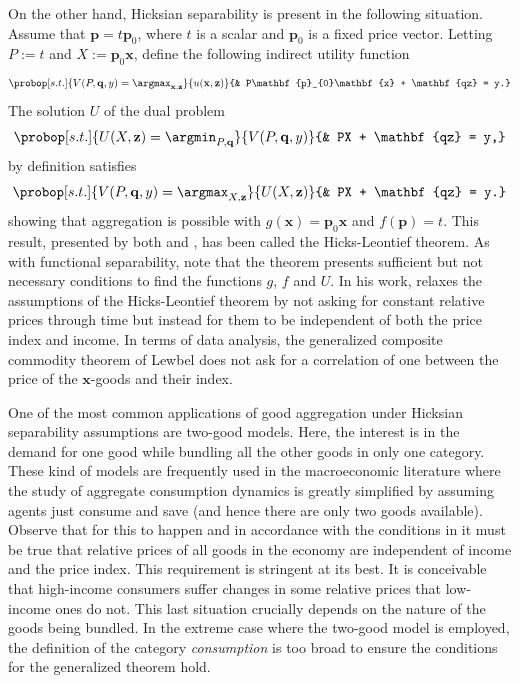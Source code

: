 \documentclass[english, a4paper, 12pt]{article}
\begin{document}
On the other hand, Hicksian separability is present in the following situation. Assume that $\mathbf{p} = t\mathbf{p}_{0}$, where $t$ is a scalar and $\mathbf{p}_{0}$ is a fixed price vector. Letting $P := t$ and $X := \mathbf{p}_{0}\mathbf{x}$, define the following indirect utility function
	$$	\probop[s.t.]{V(P, \mathbf{q}, y) = \argmax_{\mathbf{x}, \mathbf{z}}}{u(\mathbf{x}, \mathbf{z})}
				{&	P\mathbf{p}_{0}\mathbf{x} + \mathbf{qz} = y.}
	$$
The solution $U$ of the dual problem
	$$	\probop[s.t.]{U(X, \mathbf{z}) = \argmin_{P, \mathbf{q}}}{V(P, \mathbf{q},y)}
				{&	PX + \mathbf{qz} = y,}
	$$
by definition satisfies
	$$	\probop[s.t.]{V(P, \mathbf{q}, y) = \argmax_{X, \mathbf{z}}}{U(X, \mathbf{z})}
				{&	PX + \mathbf{qz} = y.}
	$$
showing that aggregation is possible with $g(\mathbf{x}) = \mathbf{p}_{0}\mathbf{x}$ and $f(\mathbf{p}) = t$. This result, presented by both \cite{Leontief36} and \cite{HicksBook}, has been called the Hicks-Leontief theorem. As with functional separability, note that the theorem presents sufficient but not necessary conditions to find the functions $g$, $f$ and $U$. In his work, \cite{Lewbel96} relaxes the assumptions of the Hicks-Leontief theorem by not asking for constant relative prices through time but instead for them to be independent of both the price index and income. In terms of data analysis, the generalized composite commodity theorem of Lewbel does not ask for a correlation of one between the price of the $\mathbf{x}$-goods and their index.

One of the most common applications of good aggregation under Hicksian separability assumptions are two-good models. Here, the interest is in the demand for one good while bundling all the other goods in only one category. These kind of models are frequently used in the macroeconomic literature where the study of aggregate consumption dynamics is greatly simplified by assuming agents just consume and save (and hence there are only two goods available). Observe that for this to happen and in accordance with the conditions in \cite{Lewbel96} it must be true that relative prices of all goods in the economy are independent of income and the price index. This requirement is stringent at its best. It is conceivable that high-income consumers suffer changes in some relative prices that low-income ones do not. This last situation crucially depends on the nature of the goods being bundled. In the extreme case where the two-good model is employed, the definition of the category \textit{consumption} is too broad to ensure the conditions for the generalized theorem hold.
\end{document}
